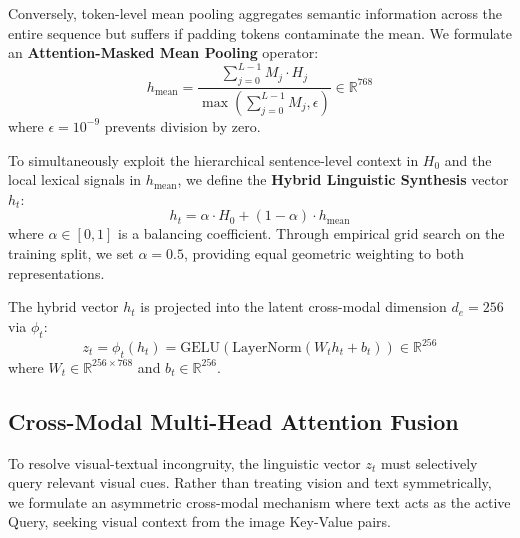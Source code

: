 \documentclass[10pt,journal,compsoc]{IEEEtran}
\begin{document}
Conversely, token-level mean pooling aggregates semantic information across the entire sequence but suffers if padding tokens contaminate the mean. We formulate an \textbf{Attention-Masked Mean Pooling} operator:
\begin{equation}
    h_{\text{mean}} = \frac{\sum_{j=0}^{L-1} M_j \cdot H_j}{\max\left(\sum_{j=0}^{L-1} M_j, \epsilon\right)} \in \mathbb{R}^{768}
\end{equation}
where $\epsilon = 10^{-9}$ prevents division by zero. 

To simultaneously exploit the hierarchical sentence-level context in $H_0$ and the local lexical signals in $h_{\text{mean}}$, we define the \textbf{Hybrid Linguistic Synthesis} vector $h_t$:
\begin{equation}
    h_t = \alpha \cdot H_0 + (1 - \alpha) \cdot h_{\text{mean}}
\end{equation}
where $\alpha \in [0, 1]$ is a balancing coefficient. Through empirical grid search on the training split, we set $\alpha = 0.5$, providing equal geometric weighting to both representations.

The hybrid vector $h_t$ is projected into the latent cross-modal dimension $d_e = 256$ via $\phi_t$:
\begin{equation}
    z_t = \phi_t(h_t) = \text{GELU}\left(\text{LayerNorm}(W_t h_t + b_t)\right) \in \mathbb{R}^{256}
\end{equation}
where $W_t \in \mathbb{R}^{256 \times 768}$ and $b_t \in \mathbb{R}^{256}$.

\subsection{Cross-Modal Multi-Head Attention Fusion}
To resolve visual-textual incongruity, the linguistic vector $z_t$ must selectively query relevant visual cues. Rather than treating vision and text symmetrically, we formulate an asymmetric cross-modal mechanism where text acts as the active Query, seeking visual context from the image Key-Value pairs.
\end{document}
